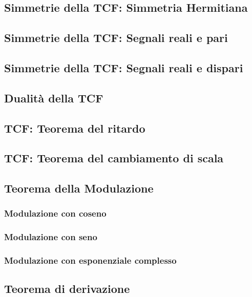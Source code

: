\documentclass[12pt,oneside,openany]{memoir}
\numberwithin{equation}{subsection}
\begin{document}
\newpage
\subsection{Simmetrie della TCF: Simmetria Hermitiana}

\newpage
\subsection{Simmetrie della TCF: Segnali reali e pari}

\newpage
\subsection{Simmetrie della TCF: Segnali reali e dispari}

\newpage
\subsection{Dualit\`a della TCF}

\newpage
\subsection{TCF: Teorema del ritardo}

\newpage
\subsection{TCF: Teorema del cambiamento di scala}

\newpage
\subsection{Teorema della Modulazione}
\newpage
\subsubsection{Modulazione con coseno}
\newpage
\subsubsection{Modulazione con seno}
\newpage
\subsubsection{Modulazione con esponenziale complesso}

\newpage
\subsection{Teorema di derivazione}
\newpage
\end{document}
